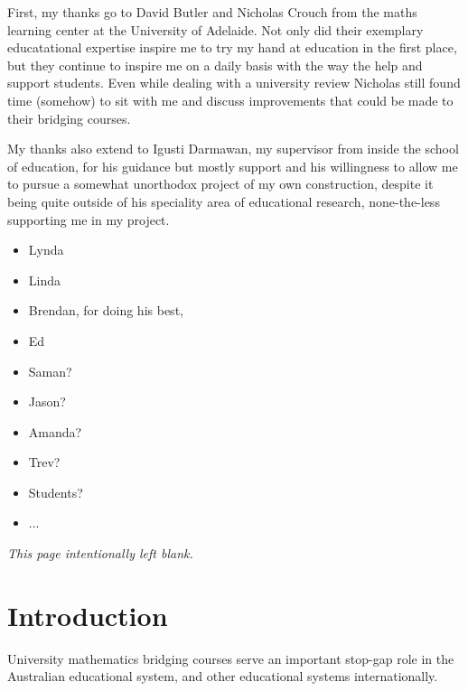 \documentclass[twoside,12pt,a4paper]{report}
\makeatletter
\newcommand*{\intentionallyblankpage}{
  \vspace*{\fill}
  {\centering \textit{This page intentionally left blank.} \par}
  \vspace{\fill}}
\renewcommand*{\cleardoublepage}{\clearpage\if@twoside \ifodd\c@page\else
  \intentionallyblankpage
  \newpage
  \if@twocolumn\hbox{}\newpage\fi\fi\fi}
\makeatother
\begin{document}
First, my thanks go to David Butler and Nicholas Crouch from the maths learning center at the University of Adelaide.
Not only did their exemplary educatational expertise inspire me to try my hand at education in the first place, but they 
continue to inspire me on a daily basis with the way the help and support students. Even while dealing with a university review Nicholas still found time (somehow) to sit with me and discuss improvements that could be made to their bridging courses. 

My thanks also extend to Igusti Darmawan, my supervisor from inside the school of education, for his guidance but mostly support and his willingness to allow me to pursue a somewhat unorthodox project of my own construction, despite it being quite outside of his speciality area of educational research, none-the-less supporting me in my project.

\begin{itemize}
	\item Lynda 
	\item Linda
	\item Brendan, for doing his best,
	\item Ed 
	\item Saman?
	\item Jason?
	\item Amanda?
	\item Trev?
	\item Students?
	\item ...
\end{itemize}





\cleardoublepage
\chapter{Introduction}
\label{chap:intro}

\glsresetall

University mathematics bridging courses serve an important stop-gap role in the Australian educational system, and other educational systems internationally.
\end{document}
